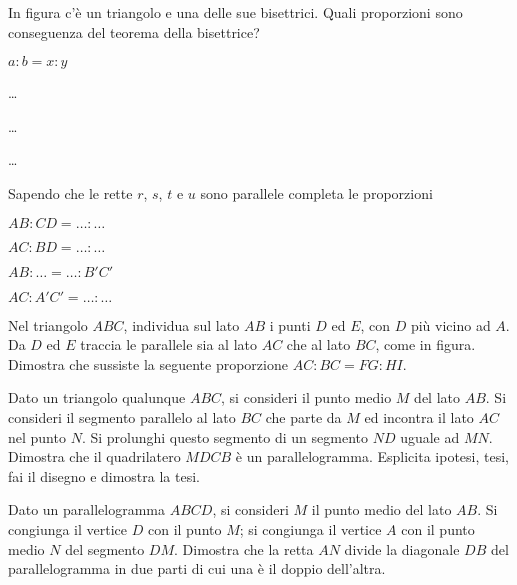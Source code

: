 \begin{multicols}{2}
\begin{esercizio}
\label{ese:6.33}
In figura c'è un triangolo e una delle sue bisettrici. Quali proporzioni sono conseguenza del teorema della bisettrice?
\begin{enumeratea}
\item $a : b = x : y$
\item \ldots{}
\item \ldots{}
\item \ldots{}
\end{enumeratea}
\end{esercizio}

\begin{esercizio}
\label{ese:6.34}
Sapendo che le rette $r$, $s$, $t$ e $u$ sono parallele completa le proporzioni
\begin{enumeratea}
\item $AB : CD = \ldots{} : \ldots{}$
\item $AC : BD = \ldots{} : \ldots{}$
\item $AB : \ldots{} = \ldots{} : B'C'$
\item $AC : A'C' = \ldots{} : \ldots{}$
\end{enumeratea}
\end{esercizio}

\begin{esercizio}
\label{ese:6.35}
Nel triangolo $ABC$, individua sul lato $AB$ i punti $D$ ed $E$, con $D$ più vicino ad $A$. Da $D$ ed $E$ traccia le parallele sia al lato $AC$ che al lato $BC$, come in figura. Dimostra che sussiste la seguente proporzione $AC:BC=FG:HI$.
\end{esercizio}

\begin{esercizio}
\label{ese:6.36}
Dato un triangolo qualunque $ABC$, si consideri il punto medio $M$ del lato $AB$. Si consideri il segmento parallelo al lato $BC$ che parte da $M$ ed incontra il lato $AC$ nel punto $N$. Si prolunghi questo segmento di un segmento $ND$ uguale ad $MN$. Dimostra che il quadrilatero $MDCB$ è un parallelogramma. Esplicita ipotesi, tesi, fai il disegno e dimostra la tesi.
\end{esercizio}

\begin{esercizio}
\label{ese:6.37}
Dato un parallelogramma $ABCD$, si consideri $M$ il punto medio del lato $AB$. Si congiunga il vertice $D$ con il punto $M$; si congiunga il vertice $A$ con il punto medio $N$ del segmento $DM$. Dimostra che la retta $AN$ divide la diagonale $DB$ del parallelogramma in due parti di cui una è il doppio dell'altra.
\end{esercizio}


\end{multicols}
